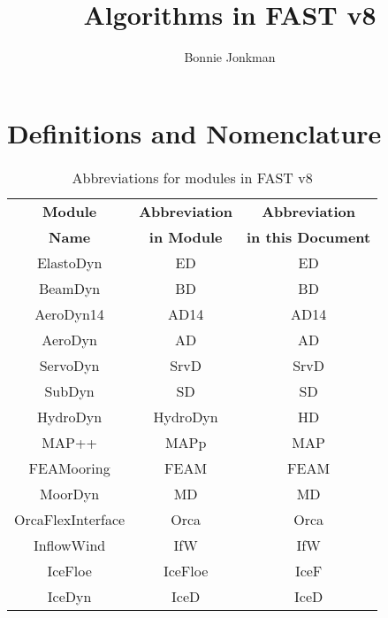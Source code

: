 \documentclass[10pt,letterpaper,oneside,notitlepage]{article}
\begin{document}
\title{Algorithms in FAST v8}
\author{Bonnie Jonkman}
\maketitle


\section{Definitions and Nomenclature}


\begin{table}[h]
	\centering
		\begin{tabular}{c|c|c}
		\textbf{Module} & \textbf{Abbreviation} & \textbf{Abbreviation}\\
		\textbf{Name}   & \textbf{in Module}    & \textbf{in this Document}\\
		\hline 
		ElastoDyn       	& ED                    & ED        \\
		BeamDyn         	& BD                    & BD        \\
		AeroDyn14       	& AD14                  & AD14      \\
		AeroDyn         	& AD                    & AD        \\
		ServoDyn        	& SrvD                  & SrvD      \\
		SubDyn         	 	& SD                    & SD        \\
		HydroDyn       	 	& HydroDyn              & HD        \\
		MAP++           	& MAPp                  & MAP       \\
		FEAMooring      	& FEAM                  & FEAM      \\
		MoorDyn         	& MD                    & MD        \\
		OrcaFlexInterface & Orca                  & Orca      \\
		InflowWind      	& IfW                   & IfW       \\   
		IceFloe         	& IceFloe               & IceF      \\   
		IceDyn          	& IceD                  & IceD      \\   
		\end{tabular}
	\caption{Abbreviations for modules in FAST v8}
	\label{tab:Abbrev}
\end{table}
\end{document}

